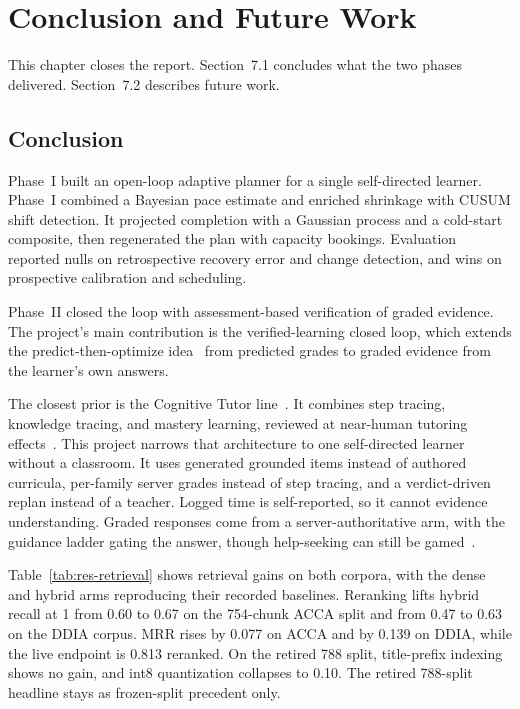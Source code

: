 \chapter{Conclusion and Future Work}
This chapter closes the report. Section~7.1 concludes what the two phases delivered. Section~7.2 describes future work.

\section{Conclusion}
Phase~I built an open-loop adaptive planner for a single self-directed learner. Phase~I combined a Bayesian pace estimate and enriched shrinkage with CUSUM shift detection. It projected completion with a Gaussian process and a cold-start composite, then regenerated the plan with capacity bookings. Evaluation reported nulls on retrospective recovery error and change detection, and wins on prospective calibration and scheduling.

Phase~II closed the loop with assessment-based verification of graded evidence. The project's main contribution is the verified-learning closed loop, which extends the predict-then-optimize idea~\cite{islam2024} from predicted grades to graded evidence from the learner's own answers.

The closest prior is the Cognitive Tutor line~\cite{anderson1995,koedinger2007}. It combines step tracing, knowledge tracing, and mastery learning, reviewed at near-human tutoring effects~\cite{vanlehn2011}. This project narrows that architecture to one self-directed learner without a classroom. It uses generated grounded items instead of authored curricula, per-family server grades instead of step tracing, and a verdict-driven replan instead of a teacher. Logged time is self-reported, so it cannot evidence understanding. Graded responses come from a server-authoritative arm, with the guidance ladder gating the answer, though help-seeking can still be gamed~\cite{gaming2026}.

Table~\ref{tab:res-retrieval} shows retrieval gains on both corpora, with the dense and hybrid arms reproducing their recorded baselines. Reranking lifts hybrid recall at 1 from 0.60 to 0.67 on the 754-chunk ACCA split and from 0.47 to 0.63 on the DDIA corpus. MRR rises by 0.077 on ACCA and by 0.139 on DDIA, while the live endpoint is 0.813 reranked. On the retired 788 split, title-prefix indexing shows no gain, and int8 quantization collapses to 0.10. The retired 788-split headline stays as frozen-split precedent only.

